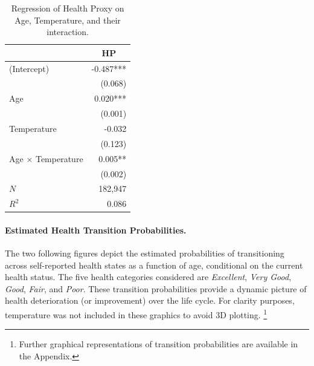\documentclass{article}
\begin{document}
\begin{table}[H]
    \begin{center}
        \begin{tabular}{lr}
            \toprule
                                    & \multicolumn{1}{c}{HP} \\ 
            \midrule
            (Intercept)              &              -0.487*** \\ 
                                    &                (0.068) \\ 
            Age                      &               0.020*** \\ 
                                    &                (0.001) \\ 
            Temperature              &                 -0.032 \\ 
                                    &                (0.123) \\ 
            Age $\times$ Temperature &                0.005** \\ 
                                    &                (0.002) \\ 
            \midrule
            $N$                      &                182,947 \\ 
            $R^2$                    &                  0.086 \\ 
            \bottomrule
        \end{tabular}
        \caption{Regression of Health Proxy on Age, Temperature, and their interaction.}
    \end{center}
\end{table}


\paragraph{Estimated Health Transition Probabilities.}
The two following figures depict the estimated probabilities of transitioning across self-reported health states as a function of age, conditional on the current health status.
The five health categories considered are \textit{Excellent}, \textit{Very Good}, \textit{Good}, \textit{Fair}, and \textit{Poor}.
These transition probabilities provide a dynamic picture of health deterioration (or improvement) over the life cycle.
For clarity purposes, temperature was not included in these graphics to avoid 3D plotting.
\footnote{Further graphical representations of transition probabilities are available in the Appendix.}
\\
\end{document}
